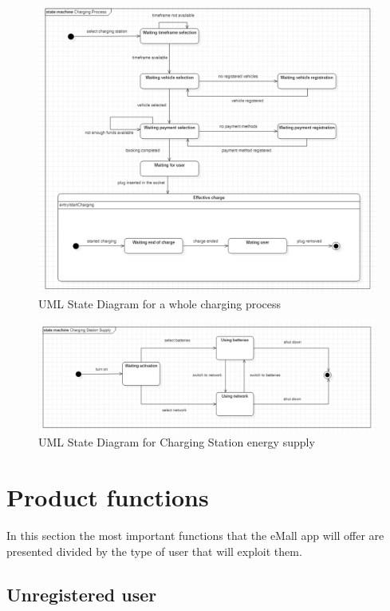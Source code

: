 \documentclass[a4paper]{report}
\begin{document}
\begin{figure}[p]
\includegraphics[width=\textwidth]{StateChartRASD}
\caption{UML State Diagram for a whole charging process}
\label{fig:state-diagramRASD}
\end{figure}

\begin{figure}[p]
\includegraphics[width=\textwidth]{ChargingStationSupplayStateChartRASD}
\caption{UML State Diagram for Charging Station energy supply}
\label{fig:state-diagramChargingRASD}
\end{figure}
\restoregeometry


\section{Product functions}
In this section the most important functions that the eMall app will offer are presented divided by the type of user that will exploit them.

\subsection{Unregistered user}
\end{document}
